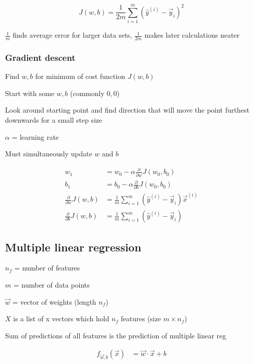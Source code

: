 \documentclass[12pt]{article}
\begin{document}
\[ J(w,b) = \frac{1}{2m} \sum_{i=1}^m ({\hat y}^{(i)} - \vec{y}_i)^2 \]

$\frac{1}{m}$ finds average error for larger data sets, $\frac{1}{2m}$ makes later calculations neater

\subsubsection{Gradient descent}

Find $w,b$ for minimum of cost function $J(w,b)$

\begin{myenumerate}
	\item Start with some $w,b$ (commonly $0,0$)
	\item Look around starting point and find direction that will move the point furthest downwards for a small step size
\end{myenumerate}

$\alpha$ = learning rate

Must simultaneously update $w$ and $b$

\begin{align*}
    w_1 &= w_0 - \alpha \frac{\partial}{\partial w} J(w_0,b_0)\\
    b_1 &= b_0 - \alpha \frac{\partial}{\partial b} J(w_0,b_0)\\
    \frac{\partial}{\partial w} J(w,b) &= \frac{1}{m} \sum_{i=1}^m ({\hat y}^{(i)} - \vec{y}_i) \vec{x}^{(i)}\\
    \frac{\partial}{\partial b} J(w,b) &= \frac{1}{m} \sum_{i=1}^m ({\hat y}^{(i)} - \vec{y}_i)
\end{align*}

\subsection{Multiple linear regression}

$n_f$ = number of features

$m$ = number of data points

$\vec{w}$ = vector of weights (length $n_f$)

$X$ is a list of x vectors which hold $n_f$ features (size $m \times n_f$)

Sum of predictions of all features is the prediction of multiple linear reg

\begin{align*}
    f_{\vec{w},b}(\vec{x}) &= \vec{w} \cdot \vec{x} + b
\end{align*}
\end{document}
